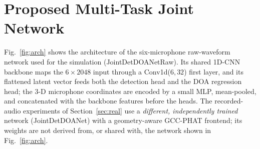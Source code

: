 \documentclass[sensors,article,submit,pdftex,moreauthors]{Definitions/mdpi}
\begin{document}
\section{Proposed Multi-Task Joint Network}
\label{sec:method}
Fig.~\ref{fig:arch} shows the architecture of the six-microphone raw-waveform network used for the simulation (JointDetDOANetRaw). Its shared 1D-CNN backbone maps the $6\times2048$ input through a Conv1d($6,32$) first layer, and its flattened latent vector feeds both the detection head and the DOA regression head; the 3-D microphone coordinates are encoded by a small MLP, mean-pooled, and concatenated with the backbone features before the heads. The recorded-audio experiments of Section~\ref{sec:real} use a \emph{different, independently trained} network (JointDetDOANet) with a geometry-aware GCC-PHAT frontend; its weights are not derived from, or shared with, the network shown in Fig.~\ref{fig:arch}.
\end{document}
